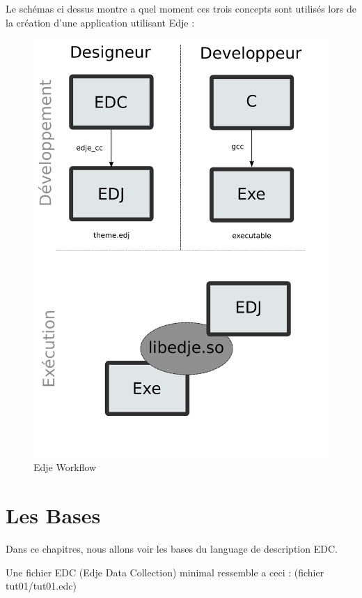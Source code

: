 \documentclass[a4paper]{efr}
\begin{document}
Le schémas ci dessus montre a quel moment ces trois concepts sont utilisés lors
de la création d'une application utilisant Edje :

\begin{figure}
  \begin{center}
    \includegraphics[scale=0.7]{images/workflow.pdf}
  \end{center}
  \caption{Edje Workflow}
\end{figure}

\section{Les Bases}
Dans ce chapitres, nous allons voir les bases du language de description EDC.

Une fichier EDC (Edje Data Collection) minimal ressemble a ceci : (fichier
tut01/tut01.edc)
\end{document}

